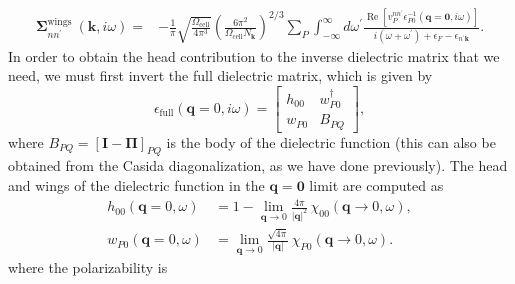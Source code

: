\begin{align}
\bm{\Sigma}_{n n^{\prime}}^{\text {wings }}(\mathbf{k}, i \omega)= & -\frac{1}{\pi} \sqrt{\frac{\Omega_{\mathrm{cell}}}{4 \pi^3}}\left(\frac{6 \pi^2}{\Omega_{\mathrm{cell}} N_{\mathbf{k}}}\right)^{2 / 3} \sum_P \int_{-\infty}^{\infty} d \omega^{\prime} \frac{\operatorname{Re}\left[v_P^{n n^{\prime}} \epsilon_{P 0}^{-1}(\mathbf{q}=\mathbf{0}, i \omega)\right]}{i\left(\omega+\omega^{\prime}\right)+\epsilon_F-\epsilon_{n^{\prime} \mathbf{k}}} .
\end{align}
In order to obtain the head contribution to the inverse dielectric matrix that we need, we must first invert the full dielectric matrix, which is given by
\begin{equation}
\epsilon_{\mathrm{full}}(\mathbf{q}=0, i \omega)
  = \begin{bmatrix}
      h_{00}        & w_{P0}^{\dagger} \\
      w_{P0}        & B_{PQ}
    \end{bmatrix},
\end{equation}
where $B_{PQ} = [\mathbf{I}-\mathbf{\Pi}]_{PQ}$ is the body of the
dielectric function (this can also be obtained from the Casida diagonalization, as we have done previously).
The head and wings of the dielectric function in the
$\mathbf{q}=\mathbf{0}$ limit are computed as
\begin{align}
    h_{00}(\mathbf{q}=0, \omega)
    &= 1 - \lim_{\mathbf{q} \rightarrow 0}
          \frac{4 \pi}{\lvert\mathbf{q}\rvert^2}\,
          \chi_{00}(\mathbf{q} \rightarrow 0, \omega), \tag{47} \\
  w_{P0}(\mathbf{q}=0, \omega)
    &= \lim_{\mathbf{q} \rightarrow 0}
       \frac{\sqrt{4 \pi}}{\lvert\mathbf{q}\rvert}\,
       \chi_{P0}(\mathbf{q} \rightarrow 0, \omega).
       \tag{48}
\end{align}
where the polarizability is
